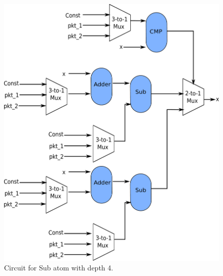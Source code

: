 \begin{figure}[!htbp]
  \includegraphics[width=\columnwidth]{sub.pdf}
  \caption{Circuit for Sub atom with depth 4.}
  \label{fig:sub}
\end{figure}

\FloatBarrier

